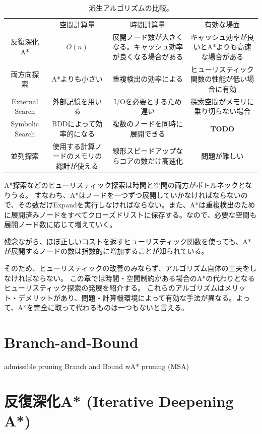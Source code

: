 \documentclass[b5paper]{report}
\newcommand{\TODO}{{\bf TODO}}
\begin{document}
\begin{table}
\caption{派生アルゴリズムの比較。}
\label{tbl:search-variants}
\begin{adjustbox}{width=\textwidth}
\begin{tabular}{cccc}
					& 空間計算量	& 時間計算量 & 有効な場面 \\
	反復深化A*		& $O(n)$  	& 展開ノード数が大きくなる。キャッシュ効率が良くなる場合がある & キャッシュ効率が良いとA*よりも高速な場合がある \\
	両方向探索 		& A*よりも小さい	& 重複検出の効率による & ヒューリスティック関数の性能が低い場合に有効 \\
	External Search & 外部記憶を用いる & I/Oを必要とするため遅い & 探索空間がメモリに乗り切らない場合 \\
	Symbolic Search & BDDによって効率的になる & 複数のノードを同時に展開できる & \TODO \\
	並列探索 			& 使用する計算ノードのメモリの総計が使える & 線形スピードアップならコアの数だけ高速化 & 問題が難しい \\
\end{tabular}
\end{adjustbox}
\end{table}


A*探索などのヒューリスティック探索は時間と空間の両方がボトルネックとなりうる。
すなわち、A*はノードを一つずつ展開していかなければならないので、その数だけExpandを実行しなければならない。また、A*は重複検出のために展開済みノードをすべてクローズドリストに保存する。なので、必要な空間も展開ノード数に応じて増えていく。

残念ながら、ほぼ正しいコストを返すヒューリスティック関数を使っても、A*が展開するノードの数は指数的に増加することが知られている\cite{helmert:08}。

そのため、ヒューリスティックの改善のみならず、アルゴリズム自体の工夫をしなければならない。
この章では時間・空間制約がある場合のA*の代わりとなるヒューリスティック探索の発展を紹介する。
これらのアルゴリズムはメリット・デメリットがあり、問題・計算機環境によって有効な手法が異なる。よって、A*を完全に取って代わるものは一つもないと言える。

\section{Branch-and-Bound}
\label{sec:branch-and-bound}
admissible pruning
 Branch and Bound
 wA* pruning (MSA)



\section{反復深化A* (Iterative Deepening A*)}
\label{sec:iterative-deepening-astar}
\end{document}

